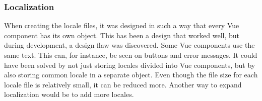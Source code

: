 \subsubsection{Localization}
When creating the locale files, it was designed in such a way that every Vue component has its own object. This has been a design that worked well, but during development, a design flaw was discovered. Some Vue components use the same text. This can, for instance, be seen on buttons and error messages. It could have been solved by not just storing locales divided into Vue components, but by also storing common locale in a separate object. Even though the file size for each locale file is relatively small, it can be reduced more. Another way to expand localization would be to add more locales.